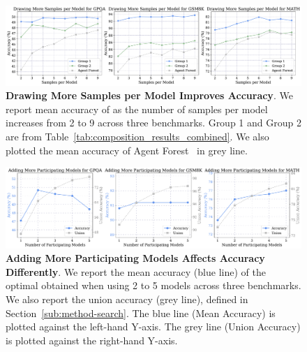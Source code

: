 \begin{figure}[t]
    \centering
    \includegraphics[width=\textwidth]{Figures/scaling_curves.pdf}
    \vspace{-20pt}
    \caption{\small \textbf{Drawing More Samples per Model Improves Accuracy}. We report mean accuracy of \NAME{} as the number of samples per model increases from 2 to 9 across three benchmarks. Group 1 and Group 2 are from  Table~\ref{tab:composition_results_combined}. We also plotted the mean accuracy of Agent Forest~\citep{li2024agentsneed} in grey line. }
    \vspace{-15pt}
    \label{fig:samples_per_model}
\end{figure}

\begin{figure}[t]
    \centering
    \includegraphics[width=\textwidth]{Figures/Adding_More_Participating_Models.pdf}
    \vspace{-20pt}
    \caption{\small \textbf{Adding More Participating Models Affects Accuracy Differently}. We report the mean accuracy (blue line) of the optimal \NAME{}  obtained when using 2 to 5 models across three benchmarks. We also report the union accuracy (grey line), defined in Section~\ref{sub:method-search}. The blue line (Mean Accuracy) is plotted against the left-hand Y-axis. The grey line (Union Accuracy) is plotted against the right-hand Y-axis. }
    \label{fig:scaling_model_counts}
\end{figure}


